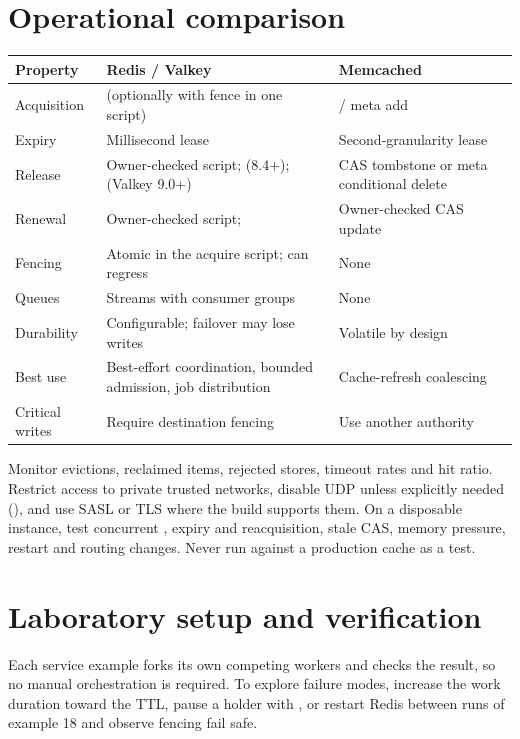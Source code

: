 \section{Operational comparison}
\begin{longtable}{L{.20\linewidth}L{.36\linewidth}L{.36\linewidth}}\toprule Property & Redis / Valkey & Memcached \\ \midrule\endhead
Acquisition &  (optionally with fence  in one script) &  / meta add \\
Expiry & Millisecond lease & Second-granularity lease \\
Release & Owner-checked script;  (8.4+);  (Valkey 9.0+) & CAS tombstone or meta conditional delete \\
Renewal & Owner-checked script;  & Owner-checked CAS update \\
Fencing & Atomic  in the acquire script; can regress & None \\
Queues & Streams with consumer groups & None \\
Durability & Configurable; failover may lose writes & Volatile by design \\
Best use & Best-effort coordination, bounded admission, job distribution & Cache-refresh coalescing \\
Critical writes & Require destination fencing & Use another authority \\
\bottomrule\end{longtable}
Monitor evictions, reclaimed items, rejected stores, timeout rates and hit ratio. Restrict access to private trusted networks, disable UDP unless explicitly needed (), and use SASL or TLS where the build supports them. On a disposable instance, test concurrent , expiry and reacquisition, stale CAS, memory pressure, restart and routing changes. Never run  against a production cache as a test.

\section{Laboratory setup and verification}
Each service example forks its own competing workers and checks the result, so no manual orchestration is required. To explore failure modes, increase the work duration toward the TTL, pause a holder with , or restart Redis between runs of example 18 and observe fencing fail safe.
